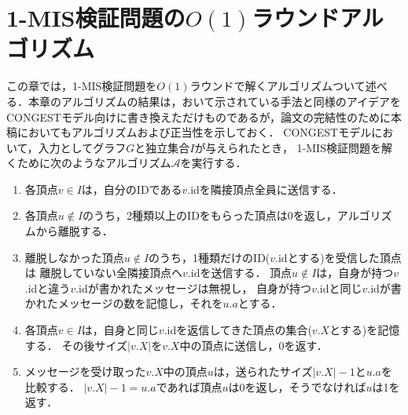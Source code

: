 \documentclass[12pt]{thesis}
\newcommand{\CONGEST}{\textsf{CONGEST}}
\theoremstyle{definition}
\begin{document}
\chapter{1-MIS検証問題の$O(1)$ラウンドアルゴリズム}
この章では，1-MIS検証問題を$O(1)$ラウンドで解くアルゴリズムついて述べる．本章のアルゴリズムの結果は，\cite{tanaka2019self}おいて示されている手法と同様のアイデアを{\CONGEST}モデル向けに書き換えただけものであるが，論文の完結性のために本稿においてもアルゴリズムおよび正当性を示しておく．
{\CONGEST}モデルにおいて，入力としてグラフ$G$と独立集合$I$が与えられたとき，
1-MIS検証問題を解くために次のようなアルゴリズム$\mathcal{A}$を実行する．
\begin{enumerate}
\item 各頂点$v \in I$は，自分のIDである$v$.idを隣接頂点全員に送信する．
\item 各頂点$u \notin I$のうち，2種類以上のIDをもらった頂点は0を返し，アルゴリズムから離脱する．
\item 離脱しなかった頂点$u \notin I$のうち，1種類だけのID($v$.idとする)を受信した頂点は
離脱していない全隣接頂点へ$v$.idを送信する．
頂点$u \notin I$は，自身が持つ$v$.idと違う$v$.idが書かれたメッセージは無視し，
自身が持つ$v$.idと同じ$v$.idが書かれたメッセージの数を記憶し，それを$u.a$とする．
\item 各頂点$v \in I$は，自身と同じ$v$.idを返信してきた頂点の集合($v.X$とする)を記憶する．
その後サイズ$|v.X|$を$v.X$中の頂点に送信し，0を返す．
\item メッセージを受け取った$v.X$中の頂点$u$は，送られたサイズ$|v.X| - 1$と$u.a$を比較する．
$|v.X | - 1 = u.a$であれば頂点$u$は$0$を返し，そうでなければ$u$は1を返す．
\end{enumerate}
\end{document}
